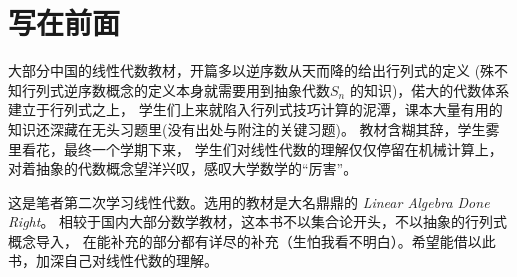 \chapter*{写在前面}
大部分中国的线性代数教材，开篇多以逆序数从天而降的给出行列式的定义
(殊不知行列式逆序数概念的定义本身就需要用到抽象代数\(S_{n}\) 的知识)，偌大的代数体系建立于行列式之上，
学生们上来就陷入行列式技巧计算的泥潭，课本大量有用的知识还深藏在无头习题里(没有出处与附注的关键习题)。
教材含糊其辞，学生雾里看花，最终一个学期下来，
学生们对线性代数的理解仅仅停留在机械计算上，对着抽象的代数概念望洋兴叹，感叹大学数学的``厉害''。

这是笔者第二次学习线性代数。选用的教材是大名鼎鼎的 \emph{Linear Algebra Done
Right}。
相较于国内大部分数学教材，这本书不以集合论开头，不以抽象的行列式概念导入，
在能补充的部分都有详尽的补充（生怕我看不明白）。希望能借以此书，加深自己对线性代数的理解。
